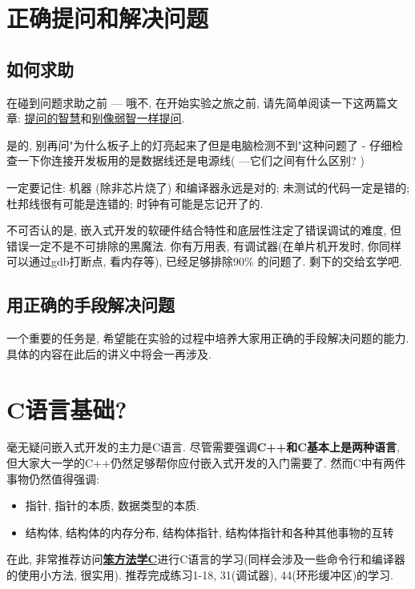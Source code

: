 \section{正确提问和解决问题}
\subsection{如何求助}
在碰到问题求助之前 --- 哦不, 在开始实验之旅之前, 请先简单阅读一下这两篇文章: \href{https://github.com/ryanhanwu/How-To-Ask-Questions-The-Smart-Way/blob/main/README-zh_CN.md}{提问的智慧}和\href{https://github.com/tangx/Stop-Ask-Questions-The-Stupid-Ways/blob/master/README.md}{别像弱智一样提问}.

\begin{definition}
	是的, 别再问"为什么板子上的灯亮起来了但是电脑检测不到"这种问题了 - 仔细检查一下你连接开发板用的是数据线还是电源线( ---它们之间有什么区别? )
\end{definition}
\begin{theorem}
	一定要记住: 机器 (除非芯片烧了) 和编译器永远是对的; 未测试的代码一定是错的; 杜邦线很有可能是连错的; 时钟有可能是忘记开了的.

	不可否认的是, 嵌入式开发的软硬件结合特性和底层性注定了错误调试的难度, 但错误一定不是不可排除的黑魔法. 你有万用表, 有调试器(在单片机开发时, 你同样可以通过gdb打断点, 看内存等), 已经足够排除90\% 的问题了. 剩下的交给玄学吧.
\end{theorem}

\subsection{用正确的手段解决问题}
一个重要的任务是, 希望能在实验的过程中培养大家用正确的手段解决问题的能力. 具体的内容在此后的讲义中将会一再涉及.

\section{C语言基础?}
毫无疑问嵌入式开发的主力是C语言. 尽管需要强调\textbf{C++和C基本上是两种语言}, 但大家大一学的{C++}仍然足够帮你应付嵌入式开发的入门需要了. 然而C中有两件事物仍然值得强调:

\begin{itemize}
	\item 指针, 指针的本质, 数据类型的本质.
	\item 结构体, 结构体的内存分布, 结构体指针, 结构体指针和各种其他事物的互转
\end{itemize}

在此, 非常推荐访问\href{https://wizardforcel.gitbooks.io/lcthw/content/}{\textbf{笨方法学C}}进行C语言的学习(同样会涉及一些命令行和编译器的使用小方法, 很实用). 推荐完成练习1-18, 31(调试器), 44(环形缓冲区)的学习.

